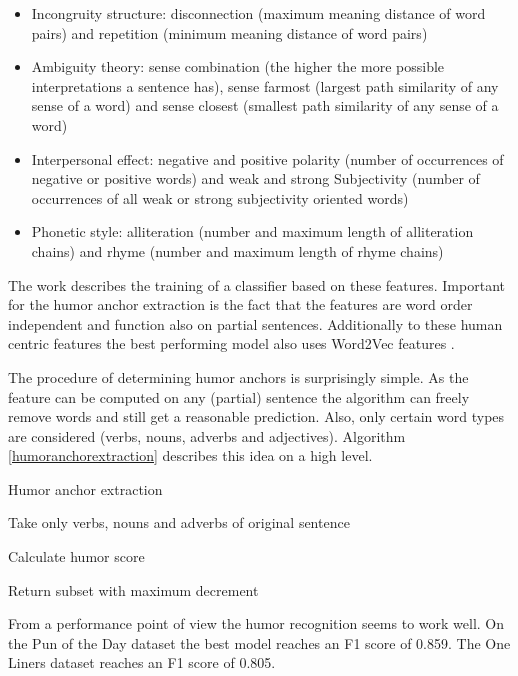 \documentclass[draft,final,oneside]{vutinfth} %
\begin{document}
\begin{itemize}
\item Incongruity structure: disconnection (maximum meaning distance of word pairs) and repetition (minimum meaning distance of word pairs)
\item Ambiguity theory: sense combination (the higher the more possible interpretations a sentence has), sense farmost (largest path similarity of any sense of a word) and sense closest (smallest path similarity of any sense of a word)
\item Interpersonal effect: negative and positive polarity (number of occurrences of negative or positive words) and weak and strong Subjectivity (number of occurrences of all weak or strong subjectivity oriented words)
\item Phonetic style: alliteration (number and maximum length of alliteration chains) and rhyme (number and maximum length of rhyme chains)
\end{itemize}

The work describes the training of a classifier based on these features. Important for the humor anchor extraction is the fact that the features are word order independent and function also on partial sentences. Additionally to these human centric features the best performing model also uses Word2Vec features \cite{word2vec}.

The procedure of determining humor anchors is surprisingly simple. As the feature can be computed on any (partial) sentence the algorithm can freely remove words and still get a reasonable prediction. Also, only certain word types are considered (verbs, nouns, adverbs and adjectives). Algorithm  \ref{humoranchorextraction} describes this idea on a high level.

\begin{algorithm}
\caption{Humor anchor extraction}\label{humoranchorextraction}

Take only verbs, nouns and adverbs of original sentence

Calculate humor score


Return subset with maximum decrement

\end{algorithm}

From a performance point of view the humor recognition seems to work well. On the Pun of the Day dataset the best model reaches an F1 score of 0.859. The One Liners dataset reaches an F1 score of 0.805.
\end{document}
